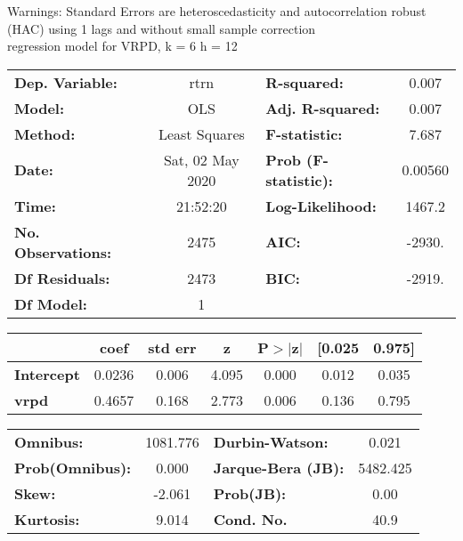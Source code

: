 Warnings: \newline
 [1] Standard Errors are heteroscedasticity and autocorrelation robust (HAC) using 1 lags and without small sample correction\\ 

regression model for VRPD, k = 6 h = 12\begin{center}
\begin{tabular}{lclc}
\toprule
\textbf{Dep. Variable:}    &       rtrn       & \textbf{  R-squared:         } &     0.007   \\
\textbf{Model:}            &       OLS        & \textbf{  Adj. R-squared:    } &     0.007   \\
\textbf{Method:}           &  Least Squares   & \textbf{  F-statistic:       } &     7.687   \\
\textbf{Date:}             & Sat, 02 May 2020 & \textbf{  Prob (F-statistic):} &  0.00560    \\
\textbf{Time:}             &     21:52:20     & \textbf{  Log-Likelihood:    } &    1467.2   \\
\textbf{No. Observations:} &        2475      & \textbf{  AIC:               } &    -2930.   \\
\textbf{Df Residuals:}     &        2473      & \textbf{  BIC:               } &    -2919.   \\
\textbf{Df Model:}         &           1      & \textbf{                     } &             \\
\bottomrule
\end{tabular}
\begin{tabular}{lcccccc}
                   & \textbf{coef} & \textbf{std err} & \textbf{z} & \textbf{P$> |$z$|$} & \textbf{[0.025} & \textbf{0.975]}  \\
\midrule
\textbf{Intercept} &       0.0236  &        0.006     &     4.095  &         0.000        &        0.012    &        0.035     \\
\textbf{vrpd}      &       0.4657  &        0.168     &     2.773  &         0.006        &        0.136    &        0.795     \\
\bottomrule
\end{tabular}
\begin{tabular}{lclc}
\textbf{Omnibus:}       & 1081.776 & \textbf{  Durbin-Watson:     } &    0.021  \\
\textbf{Prob(Omnibus):} &   0.000  & \textbf{  Jarque-Bera (JB):  } & 5482.425  \\
\textbf{Skew:}          &  -2.061  & \textbf{  Prob(JB):          } &     0.00  \\
\textbf{Kurtosis:}      &   9.014  & \textbf{  Cond. No.          } &     40.9  \\
\bottomrule
\end{tabular}
\end{center}


